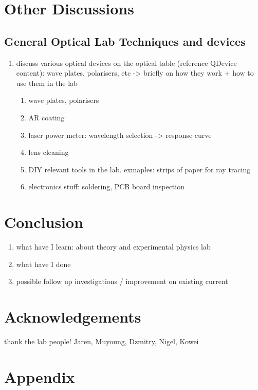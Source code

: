 \documentclass[11pt,A4Paper]{article}
\begin{document}
\section{Other Discussions}
\subsection{General Optical Lab Techniques and devices}
\begin{enumerate}
    \item discuss various optical devices on the optical table (reference QDevice content): wave plates, polarisers, etc -> briefly on how they work + how to use them in the lab 
    \begin{enumerate}
        \item wave plates, polarisers
        \item AR coating
        \item laser power meter: wavelength selection -> response curve
        \item lens cleaning
        \item DIY relevant tools in the lab. exmaples: strips of paper for ray tracing
        \item electronics stuff: soldering, PCB board inspection
        
    \end{enumerate}
\end{enumerate}


\section{Conclusion}
\begin{enumerate}
    \item what have I learn: about theory and experimental physics lab
    \item what have I done 
    \item possible follow up investigations / improvement on existing current
\end{enumerate}

\section{Acknowledgements}
thank the lab people! Jaren, Muyoung, Dzmitry, Nigel, Kowei

\section{Appendix}




\end{document}

